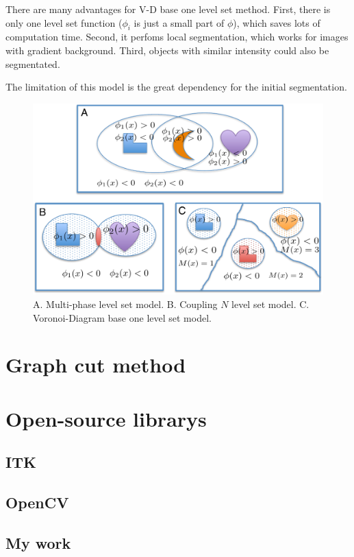 There are many advantages for V-D base one level set method. First, there is only one level set function ($\phi_i$ is just a small part of $\phi$), which saves lots of computation time. Second, it perfoms local segmentation, which works for images with gradient background. Third, objects with similar intensity could also be segmentated.

The limitation of this model is the great dependency for the initial segmentation.

\begin{figure}[htbp]
\centering
\includegraphics[width=1.0\textwidth]{images/imgseg_multiobjs}
\caption[The level set model of multi-objects segmentation]{A. Multi-phase level set model. B. Coupling $N$ level set model. C. Voronoi-Diagram base one level set model.}
\label{fig:imgseg-multiobjs}
\end{figure}

\section{Graph cut method}
\section{Open-source librarys}
\subsection{ITK}
\subsection{OpenCV}
\subsection{My work}

